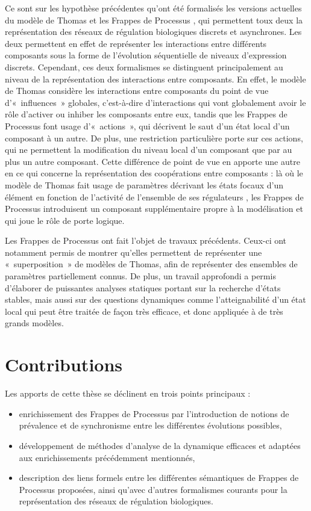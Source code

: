 Ce sont sur les hypothèse précédentes qu'ont été formalisés
les versions actuelles du modèle de Thomas \cite{Richard06}
et les Frappes de Processus \cite{PMR10-TCSB},
qui permettent toux deux
la représentation des réseaux de régulation biologiques discrets et asynchrones.
Les deux permettent en effet de représenter les interactions entre différents composants
sous la forme de l'évolution séquentielle de niveaux d'expression discrets.
Cependant, ces deux formalismes se distinguent principalement au niveau de la représentation
des interactions entre composants.
En effet, le modèle de Thomas considère les interactions entre composants du point
de vue d'«~influences~» globales, c'est-à-dire d'interactions qui vont globalement avoir
le rôle d'activer ou inhiber les composants entre eux,
tandis que les Frappes de Processus font usage d'«~actions~»,
qui décrivent le saut d'un état local d'un composant à un autre.
De plus, une restriction particulière porte sur ces actions,
qui ne permettent la modification du niveau local d'un composant
que par au plus un autre composant.
Cette différence de point de vue en apporte une autre en ce qui concerne la représentation
des coopérations entre composants :
là où le modèle de Thomas fait usage de paramètres décrivant
les états focaux d'un élément en fonction de l'activité de l'ensemble de ses régulateurs
\cite{Snoussi89},
les Frappes de Processus introduisent un composant supplémentaire propre à la modélisation
et qui joue le rôle de porte logique.

Les Frappes de Processus ont fait l'objet de travaux précédents.
Ceux-ci ont notamment permis de montrer qu'elles permettent de représenter une «~superposition~»
de modèles de Thomas, afin de représenter des ensembles de paramètres partiellement connus.
De plus, un travail approfondi a permis d'élaborer de puissantes analyses statiques
portant sur la recherche d'états stables,
mais aussi sur des questions dynamiques comme l'atteignabilité d'un état local \cite{PMR12-MSCS}
qui peut être traitée de façon très efficace, et donc appliquée à de très grands modèles.




\section{Contributions}

Les apports de cette thèse se déclinent en trois points principaux :
\begin{itemize}
  \item enrichissement des Frappes de Processus par l'introduction de notions
    de prévalence et de synchronisme entre les différentes évolutions possibles,
  \item développement de méthodes d'analyse de la dynamique efficaces
    et adaptées aux enrichissements précédemment mentionnés,
  \item description des liens formels entre les différentes sémantiques de Frappes de Processus
    proposées, ainsi qu'avec d'autres formalismes courants pour la représentation
    des réseaux de régulation biologiques.
\end{itemize}

